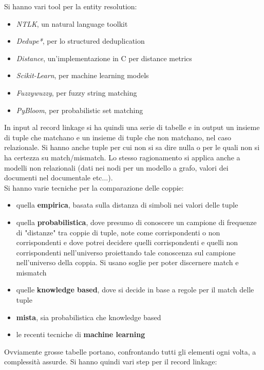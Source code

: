\documentclass[a4paper,12pt, oneside]{book}
\begin{document}
Si hanno vari tool per la entity resolution:
\begin{itemize}
  \item \textit{NTLK}, un natural language toolkit
  \item \textit{Dedupe*}, per lo structured deduplication
  \item \textit{Distance}, un'implementazione in C per distance metrics
  \item \textit{Scikit-Learn}, per machine learning models
  \item \textit{Fuzzywuzzy}, per fuzzy string matching
  \item \textit{PyBloom}, per probabilistic set matching
\end{itemize}
In input al record linkage si ha quindi una serie di tabelle e in output un
insieme di tuple che matchano e un insieme di tuple che non matchano, nel caso
relazionale. Si hanno anche tuple per cui non si sa dire nulla o per le quali
non si ha certezza su match/mismatch. Lo stesso ragionamento si applica anche a
modelli non relazionali (dati nei nodi per un modello a grafo, valori dei
documenti nel documentale etc$\ldots$).\\
Si hanno varie tecniche per la comparazione delle coppie:
\begin{itemize}
  \item quella \textbf{empirica}, basata sulla distanza di simboli nei valori
  delle tuple
  \item quella \textbf{probabilistica}, dove presumo di conoscere un campione di
  frequenze di "distanze" tra coppie di tuple, note come corrispondenti o non
  corrispondenti e dove potrei decidere quelli corrispondenti e quelli non
  corrispondenti nell'universo proiettando tale conoscenza sul campione
  nell'universo della coppia. Si usano soglie per poter discernere match e
  mismatch 
  \item quelle \textbf{knowledge based}, dove si decide in base a regole per il
  match delle tuple
  \item \textbf{mista}, sia probabilistica che knowledge based 
  
  \item le recenti tecniche di \textbf{machine learning}
\end{itemize}
Ovviamente grosse tabelle portano, confrontando tutti gli elementi ogni volta, a
complessità assurde. Si hanno quindi vari step per il record linkage:
\end{document}
